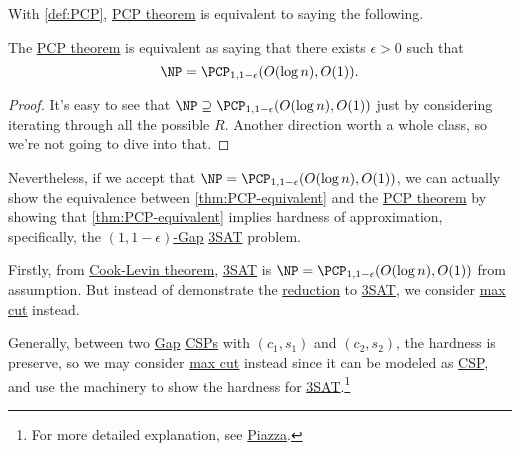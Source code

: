 With \autoref{def:PCP}, \hyperref[thm:PCP]{PCP theorem} is equivalent to saying the following.

\begin{theorem}\label{thm:PCP-equivalent}
	The \hyperref[thm:PCP]{PCP theorem} is equivalent as saying that there exists \(\epsilon > 0\) such that
	\[
		\NP = \PCP_{1, 1-\epsilon }(O(\log n), O(1)).
	\]
\end{theorem}
\begin{proof}
	It's easy to see that \(\NP \supseteq \PCP_{1, 1-\epsilon }(O(\log n), O(1))\) just by considering iterating through all the possible \(R\). Another direction worth a whole class, so we're not going to dive into that.
\end{proof}

Nevertheless, if we accept that \(\NP = \PCP_{1, 1-\epsilon }(O(\log n), O(1))\), we can actually show the equivalence between \autoref{thm:PCP-equivalent} and the \hyperref[thm:PCP]{PCP theorem} by showing that \autoref{thm:PCP-equivalent} implies hardness of approximation, specifically, the \hyperref[def:c-s-Gap]{\((1, 1-\epsilon )\)-Gap} \hyperref[prb:max-3SAT]{3SAT} problem.

Firstly, from \hyperref[thm:Cook-Levin]{Cook-Levin theorem}, \hyperref[prb:max-3SAT]{3SAT} is \(\NP=\PCP_{1, 1-\epsilon }(O(\log n), O(1))\) from assumption. But instead of demonstrate the \hyperref[def:reduction]{reduction} to \hyperref[prb:max-3SAT]{3SAT}, we consider \hyperref[prb:max-cut]{max cut} instead.

\begin{remark}
	Generally, between two \hyperref[def:c-s-Gap]{Gap} \hyperref[prb:CSP]{CSPs} with \((c_1, s_1)\) and \((c_2, s_2)\), the hardness is preserve, so we may consider \hyperref[prb:max-cut]{max cut} instead since it can be modeled as \hyperref[prb:CSP]{CSP}, and use the machinery to show the hardness for \hyperref[prb:max-3SAT]{3SAT}.\footnote{For more detailed explanation, see \href{https://piazza.com/class/l79tk1phe7k6h1/post/45}{Piazza}.}
\end{remark}

